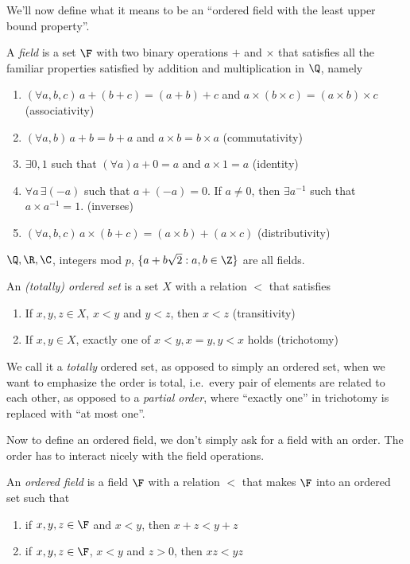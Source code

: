 \documentclass[a4paper]{article}
\begin{document}
We'll now define what it means to be an ``ordered field with the least upper bound property''.
\begin{defi}[Field]
  A \emph{field} is a set $\F$ with two binary operations $+$ and $\times$ that satisfies all the familiar properties satisfied by addition and multiplication in $\Q$, namely
  \begin{enumerate}
    \item $(\forall a, b, c)\,a + (b + c) = (a + b) + c$ and $a\times (b\times c) = (a\times b)\times c$ \hfill (associativity)
    \item $(\forall a, b)\,a + b = b + a$ and $a\times b= b\times a$ \hfill (commutativity)
    \item $\exists 0, 1$ such that $(\forall a)a + 0 = a$ and $a\times 1 = a$ \hfill (identity)
    \item $\forall a\,\exists (-a)$ such that $a + (-a) = 0$. If $a\not= 0$, then $\exists a^{-1}$ such that $a\times a^{-1} = 1$. \hfill (inverses)
    \item $(\forall a, b, c)\, a\times (b + c) = (a\times b) + (a\times c)$ \hfill (distributivity)
  \end{enumerate}
\end{defi}

\begin{eg}
  $\Q, \R, \C$, integers mod $p$, $\{a + b\sqrt{2}: a, b\in \Z\}$ are all fields.
\end{eg}

\begin{defi}
  An \emph{(totally) ordered set} is a set $X$ with a relation $<$ that satisfies
  \begin{enumerate}
    \item If $x, y, z\in X$, $x < y$ and $y < z$, then $x < z$ \hfill (transitivity)
    \item If $x, y\in X$, exactly one of $x < y, x = y, y < x$ holds \hfill (trichotomy)
  \end{enumerate}
\end{defi}
We call it a \emph{totally} ordered set, as opposed to simply an ordered set, when we want to emphasize the order is total, i.e.\ every pair of elements are related to each other, as opposed to a \emph{partial order}, where ``exactly one'' in trichotomy is replaced with ``at most one''.

Now to define an ordered field, we don't simply ask for a field with an order. The order has to interact nicely with the field operations.
\begin{defi}
  An \emph{ordered field} is a field $\F$ with a relation $<$ that makes $\F$ into an ordered set such that
  \begin{enumerate}
    \item if $x, y, z \in \F$ and $x < y$, then $x + z < y + z$
    \item if $x, y, z \in \F$, $x < y$ and $z > 0$, then $xz < yz$
  \end{enumerate}
\end{defi}
\end{document}

